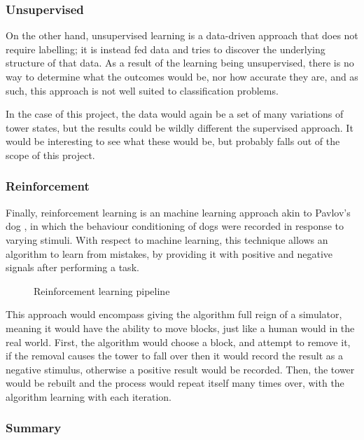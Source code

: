 \subsubsection{Unsupervised}

On the other hand, unsupervised learning is a data-driven approach that does not require labelling; it is instead fed data and tries to discover the underlying structure of that data. As a result of the learning being unsupervised, there is no way to determine what the outcomes would be, nor how accurate they are, and as such, this approach is not well suited to classification problems. 

In the case of this project, the data would again be a set of many variations of tower states, but the results could be wildly different the supervised approach. It would be interesting to see what these would be, but probably falls out of the scope of this project.

\subsubsection{Reinforcement}

Finally, reinforcement learning is an machine learning approach akin to Pavlov's dog \citep{pavlovdog}, in which the behaviour conditioning of dogs were recorded in response to varying stimuli. With respect to machine learning, this technique allows an algorithm to learn from mistakes, by providing it with positive and negative signals after performing a task.

\begin{figure}[ht]
    \centering
    \caption{Reinforcement learning pipeline}
\end{figure}

This approach would encompass giving the algorithm full reign of a \jenga{} simulator, meaning it would have the ability to move blocks, just like a human would in the real world. First, the algorithm would choose a block, and attempt to remove it, if the removal causes the tower to fall over then it would record the result as a negative stimulus, otherwise a positive result would be recorded. Then, the tower would be rebuilt and the process would repeat itself many times over, with the algorithm learning with each iteration.

\subsubsection{Summary}

